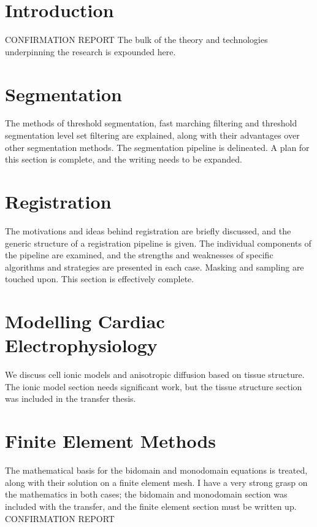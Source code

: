 
\section{Introduction}
\label{sec:review:introduction}
CONFIRMATION REPORT
The bulk of the theory and technologies underpinning the research is expounded here.
\section{Segmentation}
  The methods of threshold segmentation, fast marching filtering and threshold segmentation level set filtering are explained, along with their advantages over other segmentation methods. The segmentation pipeline is delineated. A plan for this section is complete, and the writing needs to be expanded.
\section{Registration}
  The motivations and ideas behind registration are briefly discussed, and the generic structure of a registration pipeline is given. The individual components of the pipeline are examined, and the strengths and weaknesses of specific algorithms and strategies are presented in each case. Masking and sampling are touched upon. This section is effectively complete.
\section{Modelling Cardiac Electrophysiology}
We discuss cell ionic models and anisotropic diffusion based on tissue structure. The ionic model section needs significant work, but the tissue structure section was included in the transfer thesis.
\section{Finite Element Methods}
  The mathematical basis for the bidomain and monodomain equations is treated, along with their solution on a finite element mesh. I have a very strong grasp on the mathematics in both cases; the bidomain and monodomain section was included with the transfer, and the finite element section must be written up.
CONFIRMATION REPORT


